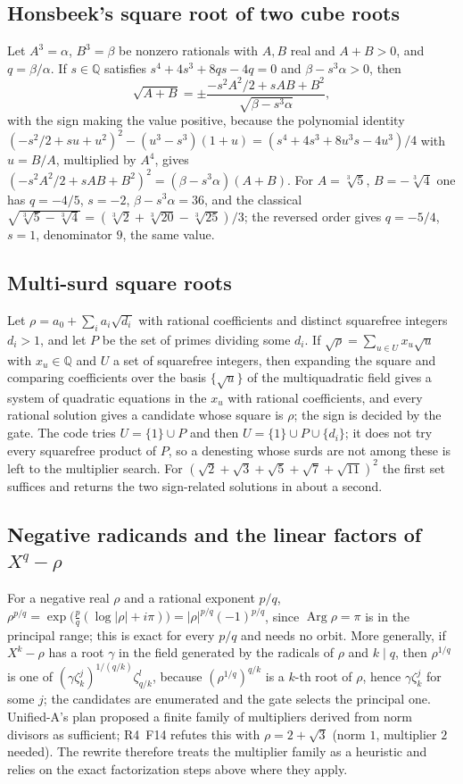 \documentclass[11pt,oneside]{article}
\numberwithin{equation}{section}
\theoremstyle{definition}
\theoremstyle{remark}
\newcommand{\code}[1]{\texttt{\detokenize{#1}}}
\newcommand{\Q}{\mathbb{Q}}
\newcommand{\RIV}{\textsf{R4}}
\DeclareMathOperator{\Arg}{Arg}
\begin{document}
\subsection{Honsbeek's square root of two cube roots}
Let $A^3=\alpha$, $B^3=\beta$ be nonzero rationals with $A,B$ real and $A+B>0$, and $q=\beta/\alpha$. If $s\in\Q$ satisfies $s^4+4s^3+8qs-4q=0$ and $\beta-s^3\alpha>0$, then
\[
\sqrt{A+B}=\pm\frac{-s^2A^2/2+sAB+B^2}{\sqrt{\beta-s^3\alpha}},
\]
with the sign making the value positive, because the polynomial identity $(-s^2/2+su+u^2)^2-(u^3-s^3)(1+u)=(s^4+4s^3+8u^3s-4u^3)/4$ with $u=B/A$, multiplied by $A^4$, gives $(-s^2A^2/2+sAB+B^2)^2=(\beta-s^3\alpha)(A+B)$. For $A=\sqrt[3]5$, $B=-\sqrt[3]4$ one has $q=-4/5$, $s=-2$, $\beta-s^3\alpha=36$, and the classical $\sqrt{\sqrt[3]5-\sqrt[3]4}=(\sqrt[3]2+\sqrt[3]{20}-\sqrt[3]{25})/3$; the reversed order gives $q=-5/4$, $s=1$, denominator $9$, the same value.

\subsection{Multi-surd square roots}
Let $\rho=a_0+\sum_{i}a_i\sqrt{d_i}$ with rational coefficients and distinct squarefree integers $d_i>1$, and let $P$ be the set of primes dividing some $d_i$. If $\sqrt\rho=\sum_{u\in U}x_u\sqrt u$ with $x_u\in\Q$ and $U$ a set of squarefree integers, then expanding the square and comparing coefficients over the basis $\{\sqrt u\}$ of the multiquadratic field gives a system of quadratic equations in the $x_u$ with rational coefficients, and every rational solution gives a candidate whose square is $\rho$; the sign is decided by the gate. The code tries $U=\{1\}\cup P$ and then $U=\{1\}\cup P\cup\{d_i\}$; it does not try every squarefree product of $P$, so a denesting whose surds are not among these is left to the multiplier search. For $(\sqrt2+\sqrt3+\sqrt5+\sqrt7+\sqrt{11})^2$ the first set suffices and \code{Solve} returns the two sign-related solutions in about a second.

\subsection{Negative radicands and the linear factors of $X^q-\rho$}
For a negative real $\rho$ and a rational exponent $p/q$, $\rho^{p/q}=\exp\bigl(\tfrac pq(\log|\rho|+i\pi)\bigr)=|\rho|^{p/q}(-1)^{p/q}$, since $\Arg\rho=\pi$ is in the principal range; this is exact for every $p/q$ and needs no orbit. More generally, if $X^k-\rho$ has a root $\gamma$ in the field generated by the radicals of $\rho$ and $k\mid q$, then $\rho^{1/q}$ is one of $(\gamma\zeta_k^j)^{1/(q/k)}\zeta_{q/k}^{l}$, because $(\rho^{1/q})^{q/k}$ is a $k$-th root of $\rho$, hence $\gamma\zeta_k^j$ for some $j$; the candidates are enumerated and the gate selects the principal one. Unified-A's plan proposed a finite family of multipliers derived from norm divisors as sufficient; \RIV\ F14 refutes this with $\rho=2+\sqrt3$ (norm $1$, multiplier $2$ needed). The rewrite therefore treats the multiplier family as a heuristic and relies on the exact factorization steps above where they apply.
\end{document}

